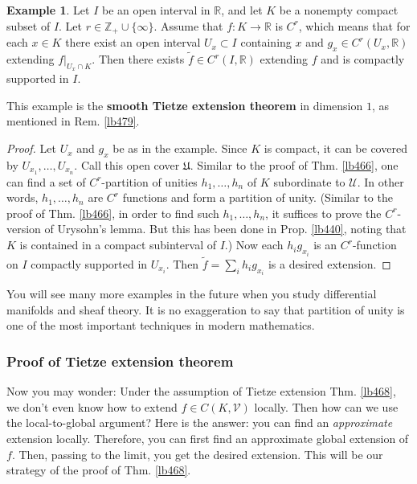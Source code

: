 \documentclass[12pt,b5paper,notitlepage]{article}
\theoremstyle{definition}
\newtheorem{eg}[df]{Example}
\theoremstyle{plain}
\newcommand{\fk}{\mathfrak}
\newcommand{\mc}{\mathcal}
\newcommand{\wtd}{\widetilde}
\newcommand{\Zbb}{\mathbb Z}
\newcommand{\Rbb}{\mathbb R}
\numberwithin{equation}{section}
\begin{document}
\begin{eg}\label{lb478}
Let $I$ be an open interval in $\Rbb$, and let $K$ be a nonempty compact subset of $I$. Let $r\in\Zbb_+\cup\{\infty\}$. Assume that $f:K\rightarrow\Rbb$ is $C^r$, which means that for each $x\in K$ there exist an open interval $U_x\subset I$ containing $x$ and $g_x\in C^r(U_x,\Rbb)$ extending $f|_{U_x\cap K}$. Then there exists $\wtd f\in C^r(I,\Rbb)$ extending $f$ and is compactly supported in $I$. 
\end{eg}

This example is the \textbf{smooth Tietze extension theorem} in dimension $1$, as mentioned in Rem. \ref{lb479}.

\begin{proof}
Let $U_x$ and $g_x$ be as in the example. Since $K$ is compact, it can be covered by $U_{x_1},\dots,U_{x_n}$. Call this open cover $\fk U$. Similar to the proof of Thm. \ref{lb466}, one can find a set of $C^r$-partition of unities $h_1,\dots,h_n$ of $K$ subordinate to $\mc U$. In other words, $h_1,\dots,h_n$ are $C^r$ functions and form a partition of unity. (Similar to the proof of Thm. \ref{lb466}, in order to find such $h_1,\dots,h_n$, it suffices to prove the $C^r$-version of Urysohn's lemma. But this has been done in Prop. \ref{lb440}, noting that $K$ is contained in a compact subinterval of $I$.) Now each $h_ig_{x_i}$ is an $C^r$-function on $I$ compactly supported in $U_{x_i}$. Then $\wtd f=\sum_i h_ig_{x_i}$ is a desired extension.
\end{proof}



You will see many more examples in the future when you study differential manifolds and sheaf theory. It is no exaggeration to say that partition of unity is one of the most important techniques in modern mathematics.




\subsubsection{Proof of Tietze extension theorem}




Now you may wonder: Under the assumption of Tietze extension Thm. \ref{lb468}, we don't even know how to extend $f\in C(K,\mc V)$ locally. Then how can we use the local-to-global argument? Here is the answer: you can find an \textit{approximate} extension locally. Therefore, you can first find an approximate global extension of $f$. Then, passing to the limit, you get the desired extension. This will be our strategy of the proof of Thm. \ref{lb468}.
\end{document}
